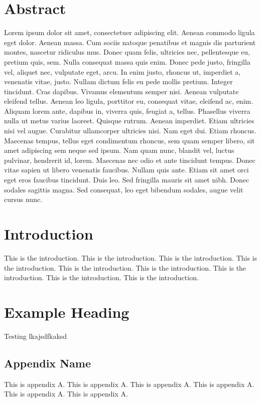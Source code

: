 \documentclass[a4paper,11pt]{report}
\begin{document}
\chapter*{\Large \center Abstract}
Lorem ipsum dolor sit amet, consectetuer adipiscing elit. Aenean commodo ligula eget dolor. Aenean massa. Cum sociis natoque penatibus et magnis dis parturient montes, nascetur ridiculus mus. Donec quam felis, ultricies nec, pellentesque eu, pretium quis, sem. Nulla consequat massa quis enim. Donec pede justo, fringilla vel, aliquet nec, vulputate eget, arcu. In enim justo, rhoncus ut, imperdiet a, venenatis vitae, justo. Nullam dictum felis eu pede mollis pretium. Integer tincidunt. Cras dapibus. Vivamus elementum semper nisi. Aenean vulputate eleifend tellus. Aenean leo ligula, porttitor eu, consequat vitae, eleifend ac, enim. Aliquam lorem ante, dapibus in, viverra quis, feugiat a, tellus. Phasellus viverra nulla ut metus varius laoreet. Quisque rutrum. Aenean imperdiet. Etiam ultricies nisi vel augue. Curabitur ullamcorper ultricies nisi. Nam eget dui. Etiam rhoncus. Maecenas tempus, tellus eget condimentum rhoncus, sem quam semper libero, sit amet adipiscing sem neque sed ipsum. Nam quam nunc, blandit vel, luctus pulvinar, hendrerit id, lorem. Maecenas nec odio et ante tincidunt tempus. Donec vitae sapien ut libero venenatis faucibus. Nullam quis ante. Etiam sit amet orci eget eros faucibus tincidunt. Duis leo. Sed fringilla mauris sit amet nibh. Donec sodales sagittis magna. Sed consequat, leo eget bibendum sodales, augue velit cursus nunc.


\tableofcontents
\listoffigures
\listoftables


\chapter{Introduction}
\label{sec:org2fcfd25}
This is the introduction.\autocite{example_citation}
This is the introduction.
This is the introduction.
This is the introduction.
This is the introduction.
This is the introduction.
This is the introduction.
This is the introduction.
This is the introduction.

\chapter{Example Heading}
\label{sec:orgdd69c82}
Testing \autocite{example_citation}
\newpage
lkajsdfkaksd

\newpage
\printbibliography[heading=bibintoc]
\begin{appendices}
\chapter{Appendix Name}
\label{sec:org0e42b20}
This is appendix A.
This is appendix A.
This is appendix A.
This is appendix A.
This is appendix A.
This is appendix A.
\end{appendices}
\end{document}
